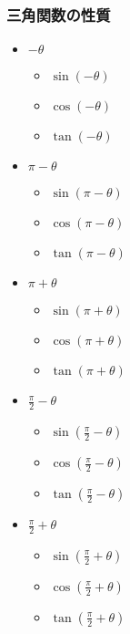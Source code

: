 \documentclass[10pt,dvipdfmx]{jsarticle}
\begin{document}
\subsubsection*{三角関数の性質}
\begin{multicols}{3}
  \begin{itemize}
    \item $-\theta$
          \begin{itemize}
            \item $\sin(-\theta)$
            \item $\cos(-\theta)$
            \item $\tan(-\theta)$
          \end{itemize}
    \item $\pi-\theta$
          \begin{itemize}
            \item $\sin(\pi-\theta)$
            \item $\cos(\pi-\theta)$
            \item $\tan(\pi-\theta)$
          \end{itemize}
    \item $\pi+\theta$
          \begin{itemize}
            \item $\sin(\pi+\theta)$
            \item $\cos(\pi+\theta)$
            \item $\tan(\pi+\theta)$
          \end{itemize}
  \end{itemize}
\end{multicols}
\begin{multicols}{2}
  \begin{itemize}
    \item $\frac{\pi}{2}-\theta$
          \begin{itemize}
            \item $\sin(\frac{\pi}{2}-\theta)$
            \item $\cos(\frac{\pi}{2}-\theta)$
            \item $\tan(\frac{\pi}{2}-\theta)$
          \end{itemize}
    \item $\frac{\pi}{2}+\theta$
          \begin{itemize}
            \item $\sin(\frac{\pi}{2}+\theta)$
            \item $\cos(\frac{\pi}{2}+\theta)$
            \item $\tan(\frac{\pi}{2}+\theta)$
          \end{itemize}
  \end{itemize}

\end{multicols}
\end{document}
